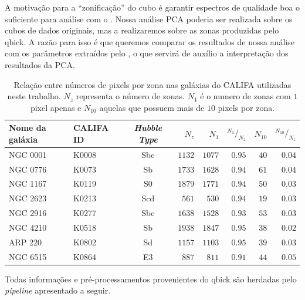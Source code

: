 A motivação para a ``zonificação'' do cubo é garantir espectros de qualidade boa o suficiente para análise com o
\starlight. Nossa análise PCA poderia ser realizada sobre os cubos de dados originais, mas a realizaremos sobre as zonas
produzidas pelo {\sc qbick}. A razão para isso é que queremos comparar os resultados de nossa análise com os parâmetros
extraídos pelo \starlight, o que servirá de auxílio a interpretação dos resultados da PCA.

\begin{table}
	\caption[Relação de pixels e zonas em algumas galáxias do CALIFA.]
	{Relação entre números de pixels por zona nas galáxias do CALIFA utilizadas neste trabalho. $N_z$ representa o número
	de zonas. $N_1$ é o numero de zonas com $1$ pixel apenas e $N_{10}$ aquelas que possuem mais de $10$ pixels por zona.}
	\begin{tabular}{l l c r r r r r}
		Nome da galáxia & CALIFA ID & {\em Hubble Type} & $N_z$ & $N_{1}$ &
		${}^{N_1}/_{N_z}$ & $N_{10}$ & ${}^{N_{10}}/_{N_z}$
		\\
		\midrule
		NGC 0001 & K0008 & Sbc & $1132$ & $1077$ & $0.95$ & $40$ & $0.04$ \\
		NGC 0776 & K0073 & Sb  & $1733$ & $1628$ & $0.94$ & $61$ & $0.04$ \\
		NGC 1167 & K0119 & S0  & $1879$ & $1771$ & $0.94$ & $50$ & $0.03$ \\
		NGC 2623 & K0213 & Scd & $561$  & $530$  & $0.94$ & $19$ & $0.03$ \\
		NGC 2916 & K0277 & Sbc & $1638$ & $1528$ & $0.93$ & $53$ & $0.03$ \\
		NGC 4210 & K0518 & Sb  & $1938$ & $1847$ & $0.95$ & $38$ & $0.02$ \\
		ARP 220  & K0802 & Sd  & $1157$ & $1103$ & $0.95$ & $39$ & $0.03$ \\
		NGC 6515 & K0864 & E3  & $887$  & $811$  & $0.91$ & $44$ & $0.05$ \\
	\end{tabular}
	\label{tab:pixelZones}
\end{table}

Todas informações e pré-processamentos provenientes do {\sc qbick} são herdadas pelo {\em pipeline} apresentado a
seguir.

\subsection{\pycasso}

